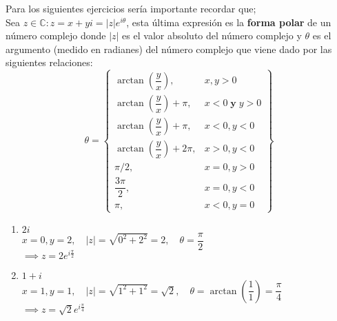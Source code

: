 \documentclass[twoside]{book}
\begin{document}
\begin{sol}
    \begin{solucion}{}
        Para los siguientes ejercicios ser\'ia importante recordar que;\\
        Sea $z\in\mathbb{C}:z=x+yi=|z|e^{i\theta}$, esta \'ultima expresi\'on es la \textbf{forma polar}  de un n\'umero complejo donde
        $|z|$ es el valor absoluto del n\'umero complejo y $\theta$ es el argumento (medido en radianes) del n\'umero complejo que viene dado por las siguientes relaciones:
        \begin{equation}\label{angulos}
            \theta = \left\{\begin{array}{lr}
                \arctan{\left(\dfrac{y}{x}\right)},      & x,y>0                  \\
                \arctan{\left(\dfrac{y}{x}\right)}+\pi,  & x<0\; \textbf{y}\; y>0 \\
                \arctan{\left(\dfrac{y}{x}\right)}+\pi,  & x<0,y<0                \\
                \arctan{\left(\dfrac{y}{x}\right)}+2\pi, & x>0,y<0                \\
                \pi/2,                                   & x=0,y>0                \\
                \dfrac{3\pi}{2},                         & x=0,y<0                \\
                \pi,                                     & x<0,y=0
            \end{array}\right\}
        \end{equation}
        \begin{enumerate}
            [label=\textsl{(\alph*)}] %
            \item $2i$\\
                  $x=0,y=2,\quad|z|=\sqrt{0^2+2^2}=2,\quad \theta=\dfrac{\pi}{2}$\\
                  $\implies\boxed{z=2e^{i\frac{\pi}{2}}}$
            \item $1+i$ \\
                  $x=1,y=1,\quad |z|=\sqrt{1^2+1^2}=\sqrt{2},\quad  \theta=\arctan\left(\dfrac{1}{1}\right)=\dfrac{\pi}{4}$
                  \\$\implies\boxed{z=\sqrt{2}e^{i\frac{\pi}{4}}}$

\end{enumerate}
\end{solucion}
\end{sol}
\end{document}
